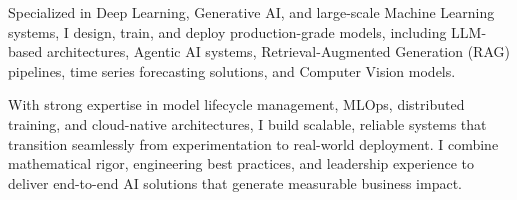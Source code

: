 %
%
%
\par{
Specialized in Deep Learning, Generative AI, and large-scale Machine Learning systems, I design, train, and deploy production-grade models, including LLM-based architectures, Agentic AI systems, Retrieval-Augmented Generation (RAG) pipelines, time series forecasting solutions, and Computer Vision models.
}
\par{
With strong expertise in model lifecycle management, MLOps, distributed training, and cloud-native architectures, I build scalable, reliable systems that transition seamlessly from experimentation to real-world deployment. I combine mathematical rigor, engineering best practices, and leadership experience to deliver end-to-end AI solutions that generate measurable business impact.
}
\vspace{1em}